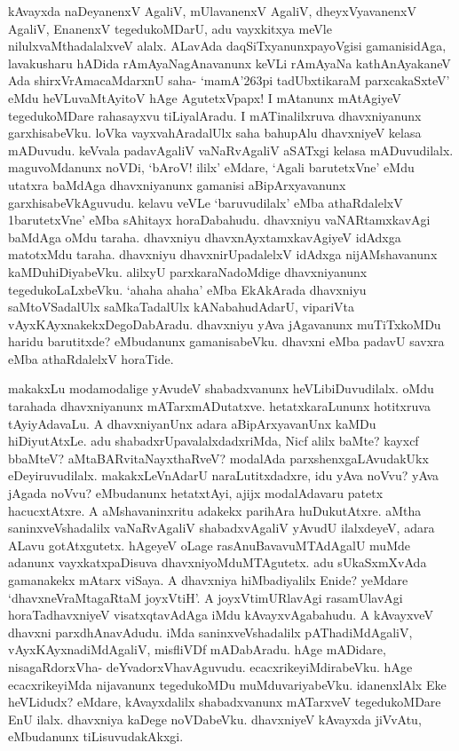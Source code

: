 kAvayxda naDeyanenxV AgaliV, mUlavanenxV AgaliV, dheyxVyavanenxV AgaliV, EnanenxV tegedukoMDarU, adu vayxkitxya meVle nilulxvaMthadalalxveV alalx. ALavAda daqSiTxyanunxpayoVgisi gamanisidAga, lavakusharu hADida rAmAyaNagAnavanunx keVLi rAmAyaNa kathAnAyakaneV Ada shirxVrAmacaMdarxnU saha- `mamA\char'263pi tadUbxtikaraM parxcakaSxteV' eMdu heVLuvaMtAyitoV hAge AgutetxVpapx! I mAtanunx mAtAgiyeV tegedukoMDare rahasayxvu tiLiyalAradu. I mATinalilxruva dhavxniyanunx garxhisabeVku. loVka vayxvahAradalUlx saha bahupAlu dhavxniyeV kelasa mADuvudu. keVvala padavAgaliV vaNaRvAgaliV aSATxgi kelasa mADuvudilalx. maguvoMdanunx noVDi, `bAroV! ililx' eMdare, `Agali barutetxVne' eMdu utatxra baMdAga dhavxniyanunx gamanisi aBipArxyavanunx garxhisabeVkAguvudu. kelavu veVLe `baruvudilalx' eMba athaRdalelxV 1barutetxVne' eMba sAhitayx horaDabahudu. dhavxniyu vaNARtamxkavAgi baMdAga oMdu taraha. dhavxniyu dhavxnAyxtamxkavAgiyeV idAdxga matotxMdu taraha. dhavxniyu dhavxnirUpadalelxV idAdxga nijAMshavanunx kaMDuhiDiyabeVku. alilxyU parxkaraNadoMdige dhavxniyanunx tegedukoLaLxbeVku. `ahaha ahaha' eMba EkAkArada dhavxniyu saMtoVSadalUlx saMkaTadalUlx kANabahudAdarU, vipariVta vAyxKAyxnakekxDegoDabAradu. dhavxniyu yAva jAgavanunx muTiTxkoMDu haridu barutitxde? eMbudanunx gamanisabeVku. dhavxni eMba padavU savxra eMba athaRdalelxV horaTide.

makakxLu modamodalige yAvudeV shabadxvanunx heVLibiDuvudilalx. oMdu tarahada dhavxniyanunx mATarxmADutatxve. hetatxkaraLununx hotitxruva tAyiyAdavaLu. A dhavxniyanUnx adara aBipArxyavanUnx kaMDu hiDiyutAtxLe. adu shabadxrUpavalalxdadxriMda, Nicf alilx baMte? kayxcf bbaMteV? aMtaBARvitaNayxthaRveV? modalAda parxshenxgaLAvudakUkx eDeyiruvudilalx. makakxLeVnAdarU naraLutitxdadxre, idu yAva noVvu? yAva jAgada noVvu? eMbudanunx hetatxtAyi, ajijx modalAdavaru patetx hacucxtAtxre. A aMshavaninxritu adakekx parihAra huDukutAtxre. aMtha saninxveVshadalilx vaNaRvAgaliV shabadxvAgaliV yAvudU ilalxdeyeV, adara ALavu gotAtxgutetx. hAgeyeV oLage rasAnuBavavuMTAdAgalU muMde adanunx vayxkatxpaDisuva dhavxniyoMduMTAgutetx. adu sUkaSxmXvAda gamanakekx mAtarx viSaya. A dhavxniya hiMbadiyalilx Enide? yeMdare `dhavxneVraMtagaRtaM joyxVtiH'. A joyxVtimURlavAgi rasamUlavAgi horaTadhavxniyeV visatxqtavAdAga iMdu kAvayxvAgabahudu. A kAvayxveV dhavxni parxdhAnavAdudu. iMda saninxveVshadalilx pAThadiMdAgaliV, vAyxKAyxnadiMdAgaliV, misfliVDf mADabAradu. hAge mADidare, nisagaRdorxVha- deYvadorxVhavAguvudu. ecacxrikeyiMdirabeVku. hAge ecacxrikeyiMda nijavanunx tegedukoMDu muMduvariyabeVku. idanenxlAlx Eke heVLidudx? eMdare, kAvayxdalilx shabadxvanunx mATarxveV tegedukoMDare EnU ilalx. dhavxniya kaDege noVDabeVku. dhavxniyeV kAvayxda jiVvAtu, eMbudanunx tiLisuvudakAkxgi.


